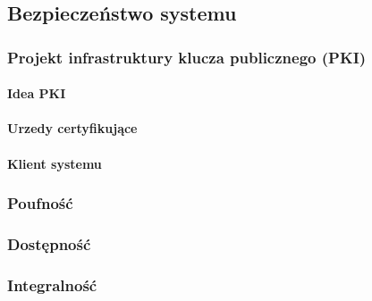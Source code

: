 \newpage
\subsection{Bezpieczeństwo systemu}
	\subsubsection{Projekt infrastruktury klucza publicznego (PKI)}
		\paragraph{Idea PKI}
		\paragraph{Urzedy certyfikujące}
		\paragraph{Klient systemu}
	\subsubsection{Poufność}
	\subsubsection{Dostępność}
	\subsubsection{Integralność}